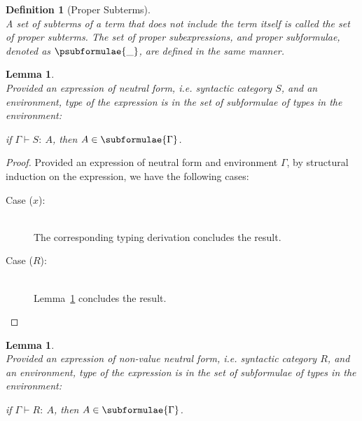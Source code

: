 \documentclass[a4paper]{article}
\newcommand{\typecolor}{}
\newcommand{\termcolor}{}
\newcommand{\tp}[1]{{\typecolor #1}}
\newcommand{\tm}[1]{{\termcolor #1}}
\newtheorem{lemma}[theorem]{Lemma}
\newtheorem{definition}{Definition}
\newcommand{\expvar}[1]{#1}
\newcommand{\env}{\tp{\Gamma}}
\newcommand{\typing}[2]{\tm{#1:\ }\tp{#2}}
\begin{document}
\begin{definition}[Proper Subterms]\ \\
A set of subterms of a term that does not include the term itself is
called the set of proper subterms. The set of proper subexpressions,
and proper subformulae, denoted as $\psubformulae{\_}$, are defined
in the same manner.
\end{definition}

\begin{lemma}\ \\
\label{sub_S}
Provided an expression of neutral form, i.e. syntactic category $S$,
and an environment, type of the expression is in the set of
subformulae of types in the environment:
 
 if $\env \vdash \typing{S}{A}$, then $A \in \subformulae{\Gamma}$.
\end{lemma}

\begin{proof}
Provided an expression of neutral form and environment $\Gamma$,
by structural induction on the expression, we have the following cases:
\begin{description}
\item[Case ($\expvar{x}$):]\ \\ 
  The corresponding typing derivation concludes the result.
\item[Case ($R$):]\ \\
  Lemma~\ref{sub_R} concludes the result.   
\end{description}

\end{proof}

\begin{lemma}\ \\
\label{sub_R}
Provided an expression of non-value neutral form, i.e. syntactic
category $R$, and an environment, type of the expression is in the set
of subformulae of types in the environment:
 
 if $\Gamma \vdash \typing{R}{A}$, then $A \in \subformulae{\Gamma}$.
\end{lemma}
\end{document}
